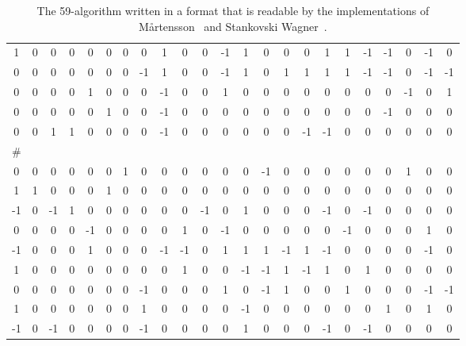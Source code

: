 \documentclass{article}
\begin{document}
\begin{appendix}
\begin{table}[ht!]
\begin{adjustbox}{max width=.99\textwidth}
\begin{tabular}{ccccc ccccc ccccc ccccc ccc}
1 & 0 & 0 & 0 & 0 & 0 & 0 & 0 & 1 & 0 & 0 & -1 & 1 & 0 & 0 & 0 & 1 & 1 & -1 & -1 & 0 & -1 & 0\\
0 & 0 & 0 & 0 & 0 & 0 & 0 & -1 & 1 & 0 & 0 & -1 & 1 & 0 & 1 & 1 & 1 & 1 & -1 & -1 & 0 & -1 & -1\\
0 & 0 & 0 & 0 & 1 & 0 & 0 & 0 & -1 & 0 & 0 & 1 & 0 & 0 & 0 & 0 & 0 & 0 & 0 & 0 & -1 & 0 & 1\\
0 & 0 & 0 & 0 & 0 & 1 & 0 & 0 & -1 & 0 & 0 & 0 & 0 & 0 & 0 & 0 & 0 & 0 & 0 & -1 & 0 & 0 & 0\\
0 & 0 & 1 & 1 & 0 & 0 & 0 & 0 & -1 & 0 & 0 & 0 & 0 & 0 & 0 & -1 & -1 & 0 & 0 & 0 & 0 & 0 & 0\\
\#\\
0 & 0 & 0 & 0 & 0 & 0 & 1 & 0 & 0 & 0 & 0 & 0 & 0 & -1 & 0 & 0 & 0 & 0 & 0 & 0 & 1 & 0 & 0\\
1 & 1 & 0 & 0 & 0 & 1 & 0 & 0 & 0 & 0 & 0 & 0 & 0 & 0 & 0 & 0 & 0 & 0 & 0 & 0 & 0 & 0 & 0\\
-1 & 0 & -1 & 1 & 0 & 0 & 0 & 0 & 0 & 0 & -1 & 0 & 1 & 0 & 0 & 0 & -1 & 0 & -1 & 0 & 0 & 0 & 0\\
0 & 0 & 0 & 0 & -1 & 0 & 0 & 0 & 0 & 1 & 0 & -1 & 0 & 0 & 0 & 0 & 0 & -1 & 0 & 0 & 0 & 1 & 0\\
-1 & 0 & 0 & 0 & 1 & 0 & 0 & 0 & -1 & -1 & 0 & 1 & 1 & 1 & -1 & 1 & -1 & 0 & 0 & 0 & 0 & -1 & 0\\
1 & 0 & 0 & 0 & 0 & 0 & 0 & 0 & 0 & 1 & 0 & 0 & -1 & -1 & 1 & -1 & 1 & 0 & 1 & 0 & 0 & 0 & 0\\
0 & 0 & 0 & 0 & 0 & 0 & 0 & -1 & 0 & 0 & 0 & 1 & 0 & -1 & 1 & 0 & 0 & 1 & 0 & 0 & 0 & -1 & -1\\
1 & 0 & 0 & 0 & 0 & 0 & 0 & 1 & 0 & 0 & 0 & 0 & -1 & 0 & 0 & 0 & 0 & 0 & 0 & 1 & 0 & 1 & 0\\
-1 & 0 & -1 & 0 & 0 & 0 & 0 & -1 & 0 & 0 & 0 & 0 & 1 & 0 & 0 & 0 & -1 & 0 & -1 & 0 & 0 & 0 & 0
    \end{tabular}
\end{adjustbox}
  \caption{The 59-algorithm written in a format that is readable by the implementations of Mårtensson~\cite{github-erik} and Stankovski Wagner~\cite{github-paul}.}
  \label{tab:fileFormat}
\end{table}

    
\end{appendix}
\end{document}
